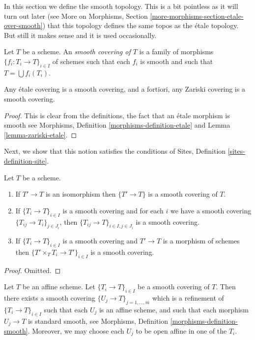 \noindent
In this section we define the smooth topology.
This is a bit pointless as it will turn out later (see
More on Morphisms, Section \ref{more-morphisms-section-etale-over-smooth})
that this topology defines the same topos as the
\'etale topology. But still it makes sense and it is used
occasionally.

\begin{definition}
\label{definition-smooth-covering}
Let $T$ be a scheme. An {\it smooth covering of $T$} is a family
of morphisms $\{f_i : T_i \to T\}_{i \in I}$ of schemes
such that each $f_i$ is smooth and such
that $T = \bigcup f_i(T_i)$.
\end{definition}

\begin{lemma}
\label{lemma-zariski-etale-smooth}
Any \'etale covering is a smooth covering, and a fortiori,
any Zariski covering is a smooth covering.
\end{lemma}

\begin{proof}
This is clear from the definitions, the fact that an \'etale morphism is
smooth see
Morphisms, Definition \ref{morphisms-definition-etale}
and Lemma \ref{lemma-zariski-etale}.
\end{proof}

\noindent
Next, we show that this notion satisfies the conditions of
Sites, Definition \ref{sites-definition-site}.

\begin{lemma}
\label{lemma-smooth}
Let $T$ be a scheme.
\begin{enumerate}
\item If $T' \to T$ is an isomorphism then $\{T' \to T\}$
is a smooth covering of $T$.
\item If $\{T_i \to T\}_{i\in I}$ is a smooth covering and for each
$i$ we have a smooth covering $\{T_{ij} \to T_i\}_{j\in J_i}$, then
$\{T_{ij} \to T\}_{i \in I, j\in J_i}$ is a smooth covering.
\item If $\{T_i \to T\}_{i\in I}$ is a smooth covering
and $T' \to T$ is a morphism of schemes then
$\{T' \times_T T_i \to T'\}_{i\in I}$ is a smooth covering.
\end{enumerate}
\end{lemma}

\begin{proof}
Omitted.
\end{proof}

\begin{lemma}
\label{lemma-smooth-affine}
Let $T$ be an affine scheme.
Let $\{T_i \to T\}_{i \in I}$ be a smooth covering of $T$.
Then there exists a smooth covering
$\{U_j \to T\}_{j = 1, \ldots, m}$ which is a refinement
of $\{T_i \to T\}_{i \in I}$ such that each $U_j$ is an affine
scheme, and such that each morphism $U_j \to T$ is standard
smooth, see Morphisms, Definition \ref{morphisms-definition-smooth}.
Moreover, we may choose each $U_j$ to be open affine in one of the $T_i$.
\end{lemma}

